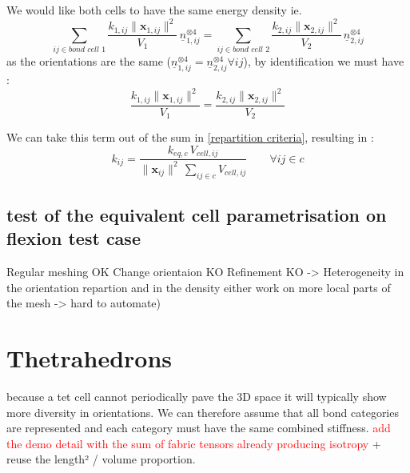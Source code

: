 \documentclass[10pt, onecolumn]{article}
\begin{document}
\begin{itemize}
        We would like both cells to have the same energy density ie.
        \begin{equation}
            \sum_{ij \in \textit{bond cell 1}} \frac{k_{1,ij} \|\mathbf{x}_{1,ij}\|^2}{V_1} \,\underline{n}_{1,ij}^{\otimes 4} = \sum_{ij \in \textit{bond cell 2}} \frac{k_{2,ij} \|\mathbf{x}_{2,ij}\|^2}{V_2} \,\underline{n}_{2,ij}^{\otimes 4}
        \end{equation}
        as the orientations are the same ($\underline{n}_{1,ij}^{\otimes 4} = \underline{n}_{2,ij}^{\otimes 4} \forall ij$), by identification we must have :
        \begin{equation}
            \frac{k_{1,ij} \|\mathbf{x}_{1,ij}\|^2}{V_1}  = \frac{k_{2,ij} \|\mathbf{x}_{2,ij}\|^2}{V_2}
        \end{equation}

        We can take this term out of the sum in \eqref{repartition criteria}, resulting in :
        \begin{equation}
            k_{ij} = \frac {k_{eq, c} \, V_{cell, ij}}{\|\mathbf{x}_{ij}\|^2 \, \sum_{ij \in c} V_{cell, ij}}   \qquad  \forall ij \in c
            \label{repartition criteria mis en evidence}
        \end{equation}

    \end{itemize}
    \subsection{test of the equivalent cell parametrisation on flexion test case}

         Regular meshing OK
        Change orientaion KO
        Refinement KO
            -> Heterogeneity in the orientation repartion and in the density either work on more local parts of the mesh -> hard to automate)




\section{Thetrahedrons}
    because a tet cell cannot periodically pave the 3D space it will typically show more diversity in orientations.
     We can therefore assume that all bond categories are represented and each category must have the same combined stiffness.
     \textcolor{red}{add the demo detail with the sum of fabric tensors already producing isotropy}
     + reuse the length² / volume proportion. 
\end{document}
